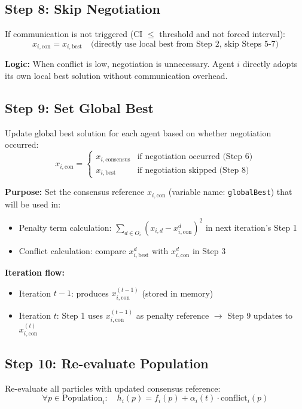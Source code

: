 \documentclass[11pt,a4paper]{article}
\begin{document}
\subsection{Step 8: Skip Negotiation}
If communication is not triggered (CI $\leq$ threshold and not forced interval):
\begin{equation}
x_{i,\text{con}} = x_{i,\text{best}} \quad \text{(directly use local best from Step 2, skip Steps 5-7)}
\end{equation}

\textbf{Logic:} When conflict is low, negotiation is unnecessary. Agent $i$ directly adopts its own local best solution without communication overhead.

\subsection{Step 9: Set Global Best}
Update global best solution for each agent based on whether negotiation occurred:
\begin{equation}
x_{i,\text{con}} = \begin{cases}
x_{i,\text{consensus}} & \text{if negotiation occurred (Step 6)} \\
x_{i,\text{best}} & \text{if negotiation skipped (Step 8)}
\end{cases}
\end{equation}

\textbf{Purpose:} Set the consensus reference $x_{i,\text{con}}$ (variable name: \texttt{globalBest}) that will be used in:
\begin{itemize}
    \item Penalty term calculation: $\sum_{d \in O_i}(x_{i,d} - x_{i,\text{con}}^d)^2$ in next iteration's Step 1
    \item Conflict calculation: compare $x_{i,\text{best}}^d$ with $x_{i,\text{con}}^d$ in Step 3
\end{itemize}

\textbf{Iteration flow:}
\begin{itemize}
    \item Iteration $t-1$: produces $x_{i,\text{con}}^{(t-1)}$ (stored in memory)
    \item Iteration $t$: Step 1 uses $x_{i,\text{con}}^{(t-1)}$ as penalty reference $\to$ Step 9 updates to $x_{i,\text{con}}^{(t)}$
\end{itemize}

\subsection{Step 10: Re-evaluate Population}
Re-evaluate all particles with updated consensus reference:
\begin{equation}
\forall p \in \text{Population}_i: \quad h_i(p) = f_i(p) + \alpha_i(t) \cdot \text{conflict}_i(p)
\end{equation}
\end{document}
